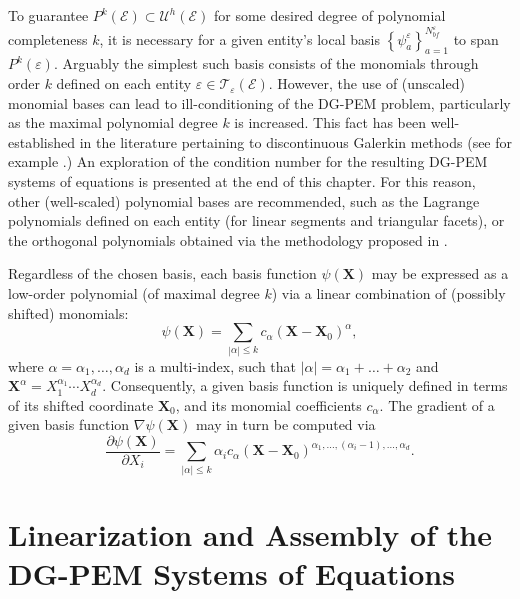 		To guarantee $P^k (\mathcal{E}) \subset \mathcal{U}^h (\mathcal{E})$ for some desired degree of polynomial completeness $k$, it is necessary for a given entity's local basis $\left\{ \psi^\varepsilon_{a} \right\}_{a=1}^{N^\varepsilon_{bf}}$ to span $P^k (\varepsilon)$. Arguably the simplest such basis consists of the monomials through order $k$ defined on each entity $\varepsilon \in \mathcal{T}_\varepsilon (\mathcal{E})$. However, the use of (unscaled) monomial bases can lead to ill-conditioning of the DG-PEM problem, particularly as the maximal polynomial degree $k$ is increased. This fact has been well-established in the literature pertaining to discontinuous Galerkin methods (see for example \cite{Hesthaven:10}.) An exploration of the condition number for the resulting DG-PEM systems of equations is presented at the end of this chapter. For this reason, other (well-scaled) polynomial bases are recommended, such as the Lagrange polynomials defined on each entity (for linear segments and triangular facets), or the orthogonal polynomials obtained via the methodology proposed in \cite{Bassi:12}.
		
		Regardless of the chosen basis, each basis function $\psi (\mathbf{X})$ may be expressed as a low-order polynomial (of maximal degree $k$) via a linear combination of (possibly shifted) monomials:
		\begin{equation}
			\psi (\mathbf{X}) = \sum_{|\alpha| \leq k} c_\alpha (\mathbf{X}-\mathbf{X}_0)^{\alpha},
		\end{equation}
		where $\alpha = \alpha_1, \ldots, \alpha_d$ is a multi-index, such that $|\alpha| = \alpha_1 + \ldots + \alpha_2$ and $\mathbf{X}^\alpha = X_1^{\alpha_1} \cdots X_d^{\alpha_d}$. Consequently, a given basis function is uniquely defined in terms of its shifted coordinate $\mathbf{X}_0$, and its monomial coefficients $c_\alpha$. The gradient of a given basis function $\nabla \psi (\mathbf{X})$ may in turn be computed via
		\begin{equation}
			\frac{\partial \psi (\mathbf{X})}{\partial X_i} = \sum_{|\alpha| \leq k} \alpha_i c_\alpha (\mathbf{X}-\mathbf{X}_0)^{\alpha_1, \ldots, (\alpha_i - 1), \ldots, \alpha_d}.
		\end{equation}
		
\section{Linearization and Assembly of the \\ DG-PEM Systems of Equations}

